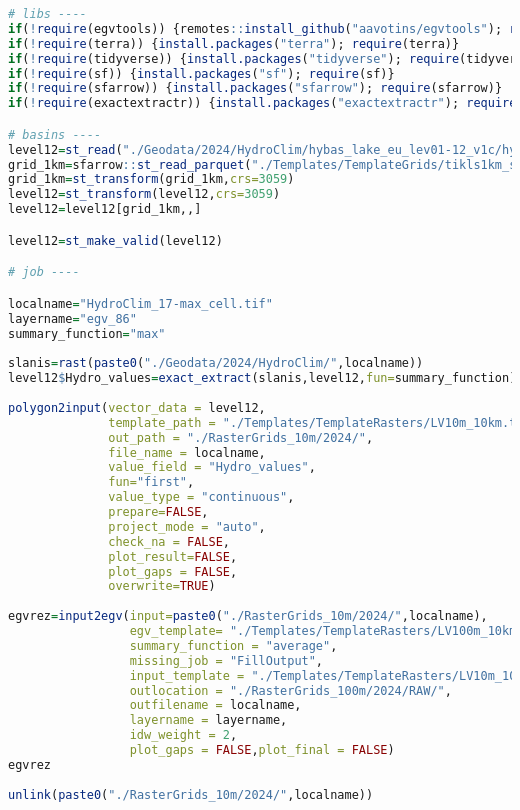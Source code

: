 \documentclass[
]{book}
\begin{document}
\begin{lstlisting}[language=R]
# libs ----
if(!require(egvtools)) {remotes::install_github("aavotins/egvtools"); require(egvtools)}
if(!require(terra)) {install.packages("terra"); require(terra)}
if(!require(tidyverse)) {install.packages("tidyverse"); require(tidyverse)}
if(!require(sf)) {install.packages("sf"); require(sf)}
if(!require(sfarrow)) {install.packages("sfarrow"); require(sfarrow)}
if(!require(exactextractr)) {install.packages("exactextractr"); require(exactextractr)}

# basins ----
level12=st_read("./Geodata/2024/HydroClim/hybas_lake_eu_lev01-12_v1c/hybas_lake_eu_lev12_v1c.shp")
grid_1km=sfarrow::st_read_parquet("./Templates/TemplateGrids/tikls1km_sauzeme.parquet")
grid_1km=st_transform(grid_1km,crs=3059)
level12=st_transform(level12,crs=3059)
level12=level12[grid_1km,,]

level12=st_make_valid(level12)

# job ----

localname="HydroClim_17-max_cell.tif"
layername="egv_86"
summary_function="max"
  
slanis=rast(paste0("./Geodata/2024/HydroClim/",localname))
level12$Hydro_values=exact_extract(slanis,level12,fun=summary_function)
  
polygon2input(vector_data = level12,
              template_path = "./Templates/TemplateRasters/LV10m_10km.tif",
              out_path = "./RasterGrids_10m/2024/",
              file_name = localname,
              value_field = "Hydro_values",
              fun="first",
              value_type = "continuous",
              prepare=FALSE,
              project_mode = "auto",
              check_na = FALSE,
              plot_result=FALSE,
              plot_gaps = FALSE,
              overwrite=TRUE)
  
egvrez=input2egv(input=paste0("./RasterGrids_10m/2024/",localname),
                 egv_template= "./Templates/TemplateRasters/LV100m_10km.tif",
                 summary_function = "average",
                 missing_job = "FillOutput",
                 input_template = "./Templates/TemplateRasters/LV10m_10km.tif",
                 outlocation = "./RasterGrids_100m/2024/RAW/",
                 outfilename = localname,
                 layername = layername,
                 idw_weight = 2,
                 plot_gaps = FALSE,plot_final = FALSE)
egvrez
  
unlink(paste0("./RasterGrids_10m/2024/",localname))
\end{lstlisting}
\end{document}
